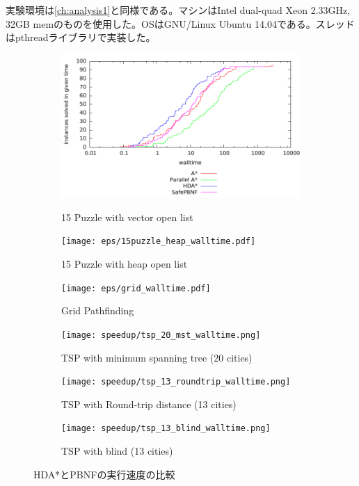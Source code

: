 \documentclass{jsarticle}
\begin{document}
実験環境は\ref{ch:analysis1}と同様である。マシンはIntel dual-quad Xeon 2.33GHz, 32GB memのものを使用した。OSはGNU/Linux Ubuntu 14.04である。スレッドはpthreadライブラリで実装した。

\begin{figure}
	\centering
	\begin{subfigure}{0.6\columnwidth}
		\includegraphics[width=\columnwidth]{eps/15puzzle_vector_walltime.pdf}
		\label{fig:15puzzle_vector}
		\caption{15 Puzzle with vector open list}
	\end{subfigure}

	\begin{subfigure}{0.6\columnwidth}
		\texttt{[image: eps/15puzzle\_heap\_walltime.pdf]}
		\label{fig:15puzzle_vector}
		\caption{15 Puzzle with heap open list}
	\end{subfigure}

	\begin{subfigure}{0.6\columnwidth}
		\texttt{[image: eps/grid\_walltime.pdf]}
		\label{fig:grid}
		\caption{Grid Pathfinding}
	\end{subfigure}

	\begin{subfigure}{0.6\columnwidth}
		\texttt{[image: speedup/tsp\_20\_mst\_walltime.png]}
		\label{fig:tsp_20_mst}
		\caption{TSP with minimum spanning tree (20 cities)}
	\end{subfigure}

	\begin{subfigure}{0.6\columnwidth}
		\texttt{[image: speedup/tsp\_13\_roundtrip\_walltime.png]}
		\label{fig:tsp_13_round}
		\caption{TSP with Round-trip distance (13 cities)}
	\end{subfigure}

	\begin{subfigure}{0.6\columnwidth}
		\texttt{[image: speedup/tsp\_13\_blind\_walltime.png]}
		\label{fig:tsp_13_blind}
		\caption{TSP with blind (13 cities)}
	\end{subfigure}
	\label{fig:comparison}
	\caption{HDA*とPBNFの実行速度の比較}
\end{figure}%
\end{document}
